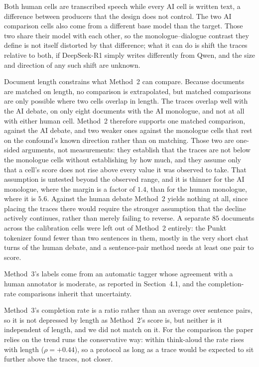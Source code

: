 \documentclass[10pt,twocolumn]{article}
\begin{document}
Both human cells are transcribed speech while every AI cell is written text, a difference between
producers that the design does not control. The two AI comparison cells also come from a different
base model than the target. Those two share their model with each other, so the monologue--dialogue
contrast they define is not itself distorted by that difference; what it can do is shift the traces
relative to both, if DeepSeek-R1 simply writes differently from Qwen, and the size and direction of
any such shift are unknown.

Document length constrains what Method~2 can compare. Because documents are matched on length, no
comparison is extrapolated, but matched comparisons are only possible where two cells overlap in
length. The traces overlap well with the AI debate, on only eight documents with the AI monologue,
and not at all with either human cell. Method~2 therefore supports one matched comparison, against
the AI debate, and two weaker ones against the monologue cells that rest on the confound's known
direction rather than on matching. Those two are one-sided arguments, not measurements: they
establish that the traces are not below the monologue cells without establishing by how much, and
they assume only that a cell's score does not rise above every value it was observed to take. That
assumption is untested beyond the observed range, and it is thinner for the AI monologue, where the
margin is a factor of $1.4$, than for the human monologue, where it is $5.6$. Against the human
debate Method~2 yields nothing at all, since placing the traces there would require the stronger
assumption that the decline actively continues, rather than merely failing to reverse. A separate
$85$ documents across the calibration cells were left out of Method~2
entirely: the Punkt tokenizer found fewer than two sentences in them, mostly in the very short chat
turns of the human debate, and a sentence-pair method needs at least one pair to score.

Method~3's labels come from an automatic tagger whose agreement with a human annotator is moderate,
as reported in Section~4.1, and the completion-rate comparisons inherit that uncertainty.

Method~3's completion rate is a ratio rather than an average over sentence pairs, so it is not
depressed by length as Method~2's score is, but neither is it independent of length, and we did not
match on it. For the comparison the paper relies on the trend runs the conservative way: within
think-aloud the rate rises with length ($\rho=+0.44$), so a protocol as long as a trace would be
expected to sit further above the traces, not closer.
\end{document}

